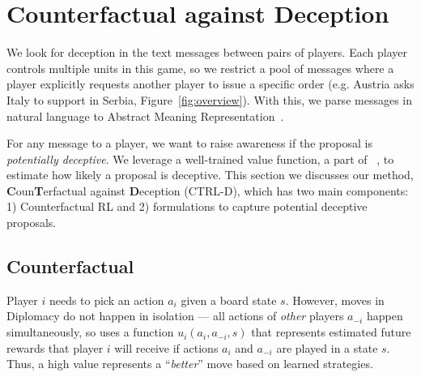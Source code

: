 \section{Counterfactual  against Deception}
\label{sec:overall_method}

We look for deception in the text messages between pairs of players.
Each player controls multiple units in this game, so we restrict a pool of messages where a player explicitly requests another player to issue a specific order (e.g. Austria asks Italy to support in Serbia, Figure~\ref{fig:overview}).  With this, we parse messages in natural language to Abstract Meaning Representation~\citep[,][]{banarescu-etal-2013-abstract}. 

For any message to a player, we want to raise awareness if the proposal is \textit{potentially deceptive}. We leverage a well-trained  value function, a part of \cicero~\citep{meta2022human}, to estimate how likely a proposal is deceptive. This section we discusses our method, \textbf{C}oun\textbf{T}erfactual \textbf{} against \textbf{D}eception (CTRL-D), which has two main components: 1) Counterfactual RL and 2) formulations to capture potential deceptive proposals.


\subsection{Counterfactual }
\label{sec:cfrl}
Player \( i \) needs to pick an action \( a_i \) given a board state \( s \). However, moves in Diplomacy do not happen in isolation --- all actions of \emph{other} players \( a_{-i} \) happen simultaneously, so \cicero{} uses a function \( u_i(a_i, a_{-i},s) \) that represents estimated future rewards that player \( i \) will receive if actions \( a_i \) and \( a_{-i} \) are played in a state \( s \). Thus, a high value represents a ``\textit{better}'' move based on learned strategies.

